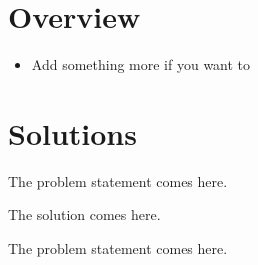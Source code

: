\documentclass{Contingent Solutions}
\begin{document}
\maketitlepage
\section{Overview}
\printtopicsandauthors
\begin{itemize}
    \item Add something more if you want to
\end{itemize}

\section{Solutions}
    \begin{problem}
    The problem statement comes here.
    \end{problem}
    \begin{solution}
    The solution comes here.
    \end{solution}
    \begin{problem}
    The problem statement comes here.
    \end{problem}
\end{document}
